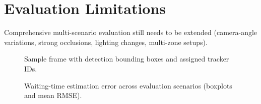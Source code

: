 \section{Evaluation Limitations}
Comprehensive multi-scenario evaluation still needs to be extended (camera-angle variations, strong occlusions, lighting changes, multi-zone setups).

\begin{figure}[H]
    \centering
    \caption{Sample frame with detection bounding boxes and assigned tracker IDs.}
    \label{fig:sample_frame}
\end{figure}

\begin{figure}[H]
    \centering
    \caption{Waiting-time estimation error across evaluation scenarios (boxplots and mean RMSE).}
    \label{fig:eval_waittime}
\end{figure}
